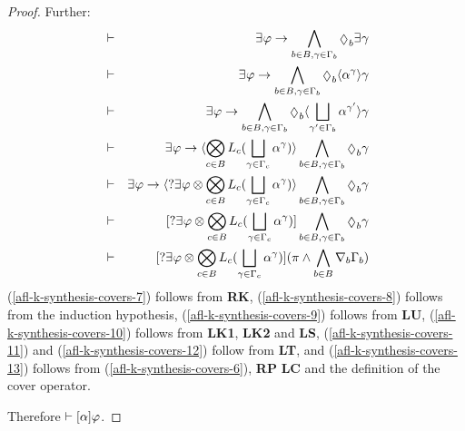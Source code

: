 \begin{proof}
Further:
\begin{eqnarray}
    &\proves& \somerefs \phi \implies \bigwedge_{\agentB \in \agentsB, \gamma \in \Gamma_\agentB} \possible_\agentB \somerefs \gamma\label{afl-k-synthesis-covers-7}\\
    &\proves& \somerefs \phi \implies \bigwedge_{\agentB \in \agentsB, \gamma \in \Gamma_\agentB} \possible_\agentB \actionE{\alpha^{\gamma}} \gamma\label{afl-k-synthesis-covers-8}\\
    &\proves& \somerefs \phi \implies \bigwedge_{\agentB \in \agentsB, \gamma \in \Gamma_\agentB} \possible_\agentB \actionE{\bigchoice_{\gamma' \in \Gamma_\agentB} \alpha^{\gamma'}} \gamma\label{afl-k-synthesis-covers-9}\\
    &\proves& \somerefs \phi \implies \actionE{\bigcompose_{\agentC \in \agentsB} \learnsC (\bigchoice_{\gamma \in \Gamma_\agentC} \alpha^\gamma)} \bigwedge_{\agentB \in \agentsB, \gamma \in \Gamma_\agentB} \possible_\agentB \gamma\label{afl-k-synthesis-covers-10}\\
    &\proves& \somerefs \phi \implies \actionE{\test{\somerefs \phi} \compose \bigcompose_{\agentC \in \agentsB} \learnsC (\bigchoice_{\gamma \in \Gamma_\agentC} \alpha^\gamma)} \bigwedge_{\agentB \in \agentsB, \gamma \in \Gamma_\agentB} \possible_\agentB \gamma\label{afl-k-synthesis-covers-11}\\
    &\proves& \actionA{\test{\somerefs \phi} \compose \bigcompose_{\agentC \in \agentsB} \learnsC (\bigchoice_{\gamma \in \Gamma_\agentC} \alpha^\gamma)} \bigwedge_{\agentB \in \agentsB, \gamma \in \Gamma_\agentB} \possible_\agentB \gamma\label{afl-k-synthesis-covers-12}\\
    &\proves& \actionA{\test{\somerefs \phi} \compose \bigcompose_{\agentC \in \agentsB} \learnsC (\bigchoice_{\gamma \in \Gamma_\agentC} \alpha^\gamma)} (\pi \land \bigwedge_{\agentB \in \agentsB} \coversB \Gamma_\agentB)\label{afl-k-synthesis-covers-13}
\end{eqnarray}
(\ref{afl-k-synthesis-covers-7}) follows from {\bf RK},
(\ref{afl-k-synthesis-covers-8}) follows from the induction hypothesis,
(\ref{afl-k-synthesis-covers-9}) follows from {\bf LU},
(\ref{afl-k-synthesis-covers-10}) follows from {\bf LK1}, {\bf LK2} and {\bf LS},
(\ref{afl-k-synthesis-covers-11}) and (\ref{afl-k-synthesis-covers-12}) follow from {\bf LT}, and
(\ref{afl-k-synthesis-covers-13}) follows from (\ref{afl-k-synthesis-covers-6}), {\bf RP} {\bf LC} and the definition of the cover operator.

Therefore $\vdash {[ {\alpha} ]} \varphi$.


\end{proof}

